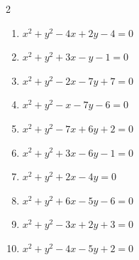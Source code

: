 \begin{multicols}{2}
\begin{enumerate}
  \item $x^{2}+y^{2}-4x+2y-4=0$

        \phantom{$\displaystyle 中心\: \left(2,-1\right), \quad 半径 \ 3$}

  \item $x^{2}+y^{2}+3x-y-1=0$


  \item $x^{2}+y^{2}-2x-7y+7=0$


  \item $x^{2}+y^{2}-x-7y-6=0$


  \item $x^{2}+y^{2}-7x+6y+2=0$


  \item $x^{2}+y^{2}+3x-6y-1=0$


  \item $x^{2}+y^{2}+2x-4y=0$


  \item $x^{2}+y^{2}+6x-5y-6=0$


  \item $x^{2}+y^{2}-3x+2y+3=0$


\columnbreak %

\resetques

  \item $x^{2}+y^{2}-4x-5y+2=0$



\end{enumerate}
\end{multicols}
